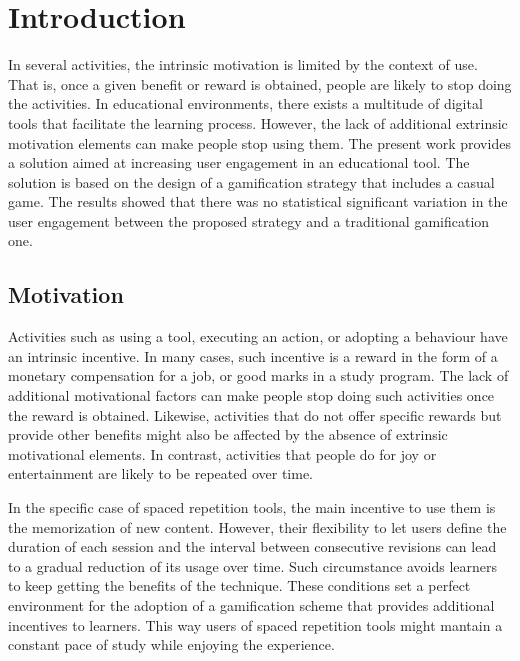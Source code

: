 
\chapter{Introduction} %

\label{intro} %


In several activities, the intrinsic motivation is limited by the context of use. That is, once a given benefit or reward is obtained, people are likely to stop doing the activities. In educational environments, there exists a multitude of digital tools that facilitate the learning process. However, the lack of additional extrinsic motivation elements can make people stop using them. The present work provides a solution aimed at increasing user engagement in an educational tool. The solution is based on the design of a gamification strategy that includes a casual game. The results showed that there was no statistical significant variation in the user engagement between the proposed strategy and a traditional gamification one.

\section{Motivation}
Activities such as using a tool, executing an action, or adopting a behaviour have an intrinsic incentive. In many cases, such incentive is a reward in the form of a monetary compensation for a job, or good marks in a study program. The lack of additional motivational factors can make people stop doing such activities once the reward is obtained. Likewise, activities that do not offer specific rewards but provide other benefits might also be affected by the absence of extrinsic motivational elements. In contrast, activities that people do for joy or entertainment are likely to be repeated over time.

In the specific case of spaced repetition tools, the main incentive to use them is the memorization of new content. However, their flexibility to let users define the duration of each session and the interval between consecutive revisions can lead to a gradual reduction of its usage over time. Such circumstance avoids learners to keep getting the benefits of the technique. These conditions set a perfect environment for the adoption of a gamification scheme that provides additional incentives to learners. This way users of spaced repetition tools might mantain a constant pace of study while enjoying the experience.

